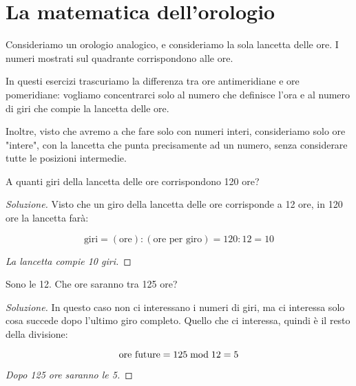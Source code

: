 \chapter{La matematica dell'orologio}

Consideriamo un orologio analogico, e consideriamo la sola lancetta delle ore. I numeri mostrati sul quadrante corrispondono alle ore.

In questi esercizi trascuriamo la differenza tra ore antimeridiane e ore pomeridiane: vogliamo concentrarci solo al numero che definisce l'ora e al numero di giri che compie la lancetta delle ore.

Inoltre, visto che avremo a che fare solo con numeri interi, consideriamo solo ore "intere", con la lancetta che punta precisamente ad un numero, senza considerare tutte le posizioni intermedie. 

\begin{mdframed}
    \begin{esercizio}
        A quanti giri della lancetta delle ore corrispondono 120 ore?
    \end{esercizio}
    \begin{proof}[Soluzione]
        Visto che un giro della lancetta delle ore corrisponde a 12 ore, in 120 ore la lancetta farà:
        
        \begin{equation*}
            \text{giri} = (\text{ore}) : (\text{ore per giro}) = 120 : 12 = 10
        \end{equation*}
        
        \emph{La lancetta compie 10 giri.}
    \end{proof}
\end{mdframed}

\begin{mdframed}
\begin{esercizio}
    Sono le 12. Che ore saranno tra 125 ore?
\end{esercizio}
\begin{proof}[Soluzione]
    In questo caso non ci interessano i numeri di giri, ma ci interessa solo cosa succede dopo l'ultimo giro completo. Quello che ci interessa, quindi è il resto della divisione:
    
    \begin{equation*}
        \text{ore future} = 125  \bmod  12 = 5
    \end{equation*}
    
    \emph{Dopo 125 ore saranno le 5.}
\end{proof}
\end{mdframed}

